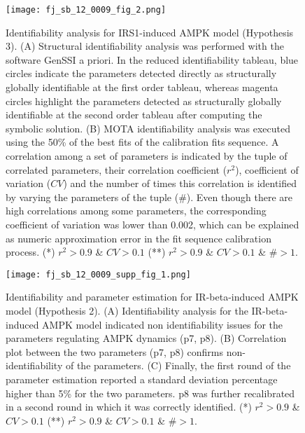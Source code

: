 \begin{figure}[tb]
	\begin{center}
		\texttt{[image: fj\_sb\_12\_0009\_fig\_2.png]}
		\caption[Identifiability analysis for IRS1-induced AMPK model (Hypothesis 3)]{Identifiability analysis for IRS1-induced AMPK model (Hypothesis 3). (A) Structural identifiability analysis was performed with the software GenSSI a priori. In the reduced identifiability tableau, blue circles indicate the parameters detected directly as structurally globally identifiable at the first order tableau, whereas magenta circles highlight the parameters detected as structurally globally identifiable at the second order tableau after computing the symbolic solution. (B) MOTA identifiability analysis was executed using the 50\% of the best fits of the calibration fits sequence. A correlation among a set of parameters is indicated by the tuple of correlated parameters, their correlation coefficient ($r^2$), coefficient of variation ($CV$) and the number of times this correlation is identified by varying the parameters of the tuple ($\#$). Even though there are high correlations among some parameters, the corresponding 
coefficient of variation was lower than 0.002, which can be explained as numeric approximation error in the fit sequence calibration process. (*) $r^2 > 0.9$ \& $CV > 0.1$  (**) $r^2 > 0.9$ \& $CV > 0.1$ \& \#$> 1$.}
		\label{fig:fj_sb_12_0009_fig_2}
	\end{center}
\end{figure}
\clearpage

\begin{figure}[tb]
	\begin{center}
		\texttt{[image: fj\_sb\_12\_0009\_supp\_fig\_1.png]}
		\caption[Identifiability and parameter estimation for IR-beta-induced AMPK model (Hypothesis 2)]{Identifiability and parameter estimation for IR-beta-induced AMPK model (Hypothesis 2). (A) Identifiability analysis for the IR-beta-induced AMPK model indicated non identifiability issues for the parameters regulating AMPK dynamics (p7, p8). (B) Correlation plot between the two parameters (p7, p8) confirms non-identifiability of the parameters. (C) Finally, the first round of the parameter estimation reported a standard deviation percentage higher than 5\% for the two parameters. p8 was further recalibrated in a second round in which it was correctly identified. (*) $r^2 > 0.9$ \& $CV > 0.1$  (**) $r^2 > 0.9$ \& $CV > 0.1$ \& \#$> 1$.}
		\label{fig:fj_sb_12_0009_supp_fig_1}
	\end{center}
\end{figure}
\clearpage

